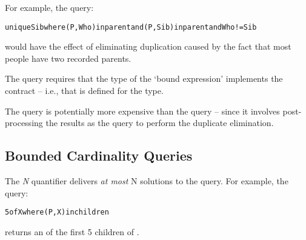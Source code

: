 For example, the query:
\begin{alltt}
unique Sib where (P,Who) in parent and (P,Sib) in parent and Who!=Sib
\end{alltt}
would have the effect of eliminating duplication caused by the fact that most people have two recorded parents.

The  query requires that the type of the `bound expression' implements the  contract -- i.e., that \q{<} is defined for the type.

\begin{aside}
The  query is potentially more expensive than the  query -- since it involves post-processing the results as the  query to perform the duplicate elimination.
\end{aside}

%
%
%
\subsection{Bounded Cardinality Queries}
The \emph{N}  quantifier delivers \emph{at most} N solutions to the query. For example, the query:
\begin{alltt}
5 of X where (P,X) in children
\end{alltt}
returns an  of the first 5 children of .

